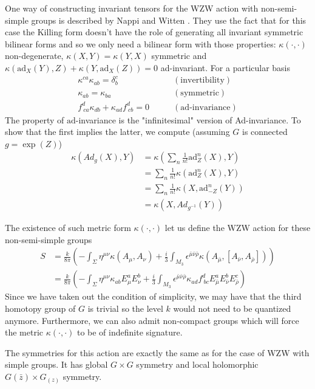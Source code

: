 \documentclass[a4paper,12pt]{article}
\numberwithin{equation}{section}
\numberwithin{thm}{section}
\numberwithin{exm}{section}
\newcommand{\ad}{\mathrm{ad}}
\newcommand{\mo}{^{-1}}
\newcommand{\zb}{{\bar z}}
\newcommand{\<}{{\langle}}
\renewcommand{\>}{{\rangle}}
\renewcommand{\d}{{\delta}}
\newcommand{\e}{{\epsilon}}
\renewcommand{\k}{{\kappa}}
\newcommand{\m}{{\mu}}
\newcommand{\n}{{\nu}}
\renewcommand{\S}{{\Sigma}}
\newcommand{\mb}{{\bar\mu}}
\newcommand{\nb}{{\bar\nu}}
\newcommand{\rb}{{\bar\rho}}
\begin{document}
One way of constructing invariant tensors for the WZW action with non-semi-simple groups is described by Nappi and Witten \cite{Nappi1993}. They use the fact that for this case the Killing form doesn't have the role of generating all invariant symmetric bilinear forms and so we only need a bilinear form with those properties: $\k(\cdot,\cdot)$ non-degenerate, $\k(X,Y) = \k(Y,X)$ symmetric and $\k(\ad_X(Y), Z) + \k(Y, \ad_X(Z)) = 0$ ad-invariant. For a particular basis
	\begin{align}
	\k^{ca}\k_{ab} = \d^c_b &\qquad (\text{invertibility}) \\
	\k_{ab} = \k_{ba} &\qquad (\text{symmetric}) \\
	f^d_{\ ca}\k_{db} + \k_{ad} f^d_{\ cb} = 0 & \qquad (\ad\text{-invariance})
	\end{align}
The property of $\ad$-invariance is the "infinitesimal" version of Ad-invariance. To show that the first implies the latter, we compute (assuming $G$ is connected $g = \exp(Z)$)
	\begin{align}
	\k(Ad_g(X),Y) & = \k(\sum_n \frac{1}{n!}\ad^n_Z(X),Y) \nonumber \\
	& = \sum_n\frac{1}{n!} \k(\ad^n_Z(X),Y) \nonumber \\
	& = \sum_n\frac{1}{n!} \k(X, \ad^n_{-Z}(Y)) \nonumber \\
	& = \k(X, Ad_{g\mo}(Y))
	\end{align}

The existence of such metric form $\k(\cdot,\cdot)$ let us define the WZW action for these non-semi-simple groups
	\begin{align}
	S & = \frac{k}{8\pi}\left(-\int_\S \eta^{\m\n}\k(A_\m, A_\n) + \frac{i}{3}\int_{M_3} \e^{\mb\nb\rb}\k(A_\mb,[A_\nb, A_\rb])\right) \nonumber \\
	& = \frac{k}{8\pi}\left( -\int_\S \eta^{\m\n}\k_{ab} E^a_\m E^b_\n + \frac{i}{3}\int_{M_3} \e^{\mb\nb\rb}\k_{ad} f^d_{\ bc} E^a_\mb E^b_\nb E^c_\rb \right)
	\end{align}
Since we have taken out the condition of simplicity, we may have that the third homotopy group of $G$ is trivial so the level $k$ would not need to be quantized anymore. Furthermore, we can also admit non-compact groups which will force the metric $\k(\cdot,\cdot)$ to be of indefinite signature\cite{Maldacena2001}.

The symmetries for this action are exactly the same as for the case of WZW with simple groups. It has global $G\times G$ symmetry and local holomorphic $G(\zb)\times G_(z)$ symmetry.
\end{document}
